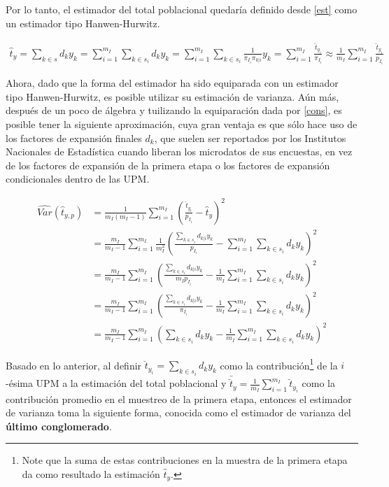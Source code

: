 \documentclass[
  10pt,
  spanish,
]{book}
\begin{document}
Por lo tanto, el estimador del total poblacional quedaría definido desde \eqref{est} como un estimador tipo Hanwen-Hurwitz.

\begin{align*}
\hat{t}_{y} =\sum_{k\in s} d_k y_k  
= \sum_{i=1}^{m_I}\sum_{k \in s_i} d_k y_k 
= \sum_{i=1}^{m_I}\sum_{k \in s_i} \frac{1}{\pi_{I_i} \pi_{k|i}} y_k 
= \sum_{i=1}^{m_I}\frac{\hat{t}_{y_i}}{\pi_{I_i}} 
\approx \frac{1}{m_I}\sum_{i=1}^{m_I}\frac{\hat{t}_{y_i}}{p_{I_i}}
\end{align*}

Ahora, dado que la forma del estimador ha sido equiparada con un estimador tipo Hanwen-Hurwitz, es posible utilizar su estimación de varianza. Aún más, después de un poco de álgebra y tuilizando la equiparación dada por \eqref{cons}, es posible tener la siguiente aproximación, cuya gran ventaja es que sólo hace uso de los factores de expansión finales \(d_k\), que suelen ser reportados por los Institutos Nacionales de Estadística cuando liberan los microdatos de sus encuestas, en vez de los factores de expansión de la primera etapa o los factores de expansión condicionales dentro de las UPM.

\begin{align*}
\widehat{Var}(\hat{t}_{y,p})&=\frac{1}{m_I(m_I-1)}\sum_{i=1}^{m_I}\left(\frac{\hat{t}_{y_i}}{p_{I_i}}-\hat{t}_{y}\right)^2\\
&=\frac{m_I}{m_I-1}\sum_{i=1}^{m_I}\frac{1}{m_I^2}\left(\frac{\sum_{k \in s_i} d_{k|i} y_k }{p_{I_i}}-\sum_{i=1}^{m_I}\sum_{k \in s_i} d_k y_k \right)^2 \\
&=\frac{m_I}{m_I-1}\sum_{i=1}^{m_I}\left(\frac{\sum_{k \in s_i} d_{k|i} y_k }{m_I p_{I_i}}-\frac{1}{m_I}\sum_{i=1}^{m_I}\sum_{k \in s_i} d_k y_k \right)^2 \\
&=\frac{m_I}{m_I-1}\sum_{i=1}^{m_I}\left(\frac{\sum_{k \in s_i} d_{k|i} y_k }{\pi_{I_i}}-\frac{1}{m_I}\sum_{i=1}^{m_I}\sum_{k \in s_i} d_k y_k \right)^2 \\
&=\frac{m_I}{m_I-1}\sum_{i=1}^{m_I}\left( \sum_{k \in s_i} d_k y_k -\frac{1}{m_I}\sum_{i=1}^{m_I}\sum_{k \in s_i} d_k y_k \right)^2 
\end{align*}

Basado en lo anterior, al definir \(\breve{t}_{y_i} = \sum_{k \in s_i} d_k y_k\) como la contribución\footnote{Note que la suma de estas contribuciones en la muestra de la primera etapa da como resultado la estimación \(\hat{t}_y\).} de la \(i\)-ésima UPM a la estimación del total poblacional y \(\bar{\breve{t}}_{y}=\frac{1}{m_I}\sum_{i=1}^{m_I}\breve{t}_{y_i}\) como la contribución promedio en el muestreo de la primera etapa, entonces el estimador de varianza toma la siguiente forma, conocida como el estimador de varianza del \textbf{último conglomerado}.
\end{document}
